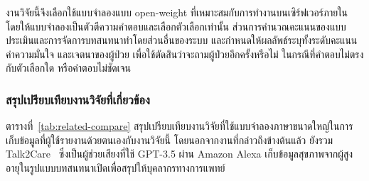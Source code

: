 งานวิจัยนี้จึงเลือกใช้แบบจำลองแบบ open-weight ที่เหมาะสมกับการทำงานบนเซิร์ฟเวอร์ภายใน โดยให้แบบจำลองเป็นตัวตีความคำตอบและเลือกตัวเลือกเท่านั้น 
ส่วนการคำนวณคะแนนของแบบประเมินและการจัดการบทสนทนาทำโดยส่วนอื่นของระบบ
และกำหนดให้ผลลัพธ์ระบุทั้งระดับคะแนน ค่าความมั่นใจ และเจตนาของผู้ป่วย เพื่อใช้ตัดสินว่าจะถามผู้ป่วยอีกครั้งหรือไม่
ในกรณีที่คำตอบไม่ตรงกับตัวเลือกใด หรือคำตอบไม่ชัดเจน

\subsubsection{สรุปเปรียบเทียบงานวิจัยที่เกี่ยวข้อง}
\label{sec:review-summary}

ตารางที่~\ref{tab:related-compare} สรุปเปรียบเทียบงานวิจัยที่ใช้แบบจำลองภาษาขนาดใหญ่ในการเก็บข้อมูลที่ผู้ใช้รายงานด้วยตนเองกับงานวิจัยนี้
โดยนอกจากงานที่กล่าวถึงข้างต้นแล้ว ยังรวม Talk2Care~\citep{Yang2024} ซึ่งเป็นผู้ช่วยเสียงที่ใช้ GPT-3.5 ผ่าน Amazon Alexa
เก็บข้อมูลสุขภาพจากผู้สูงอายุในรูปแบบบทสนทนาเปิดเพื่อสรุปให้บุคลากรทางการแพทย์

